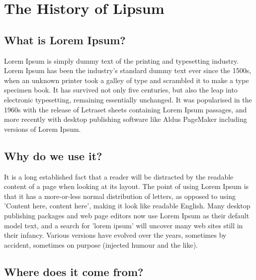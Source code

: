 





\tableofcontents


\chapter{The History of Lipsum}

\section{What is Lorem Ipsum?}

Lorem Ipsum is simply dummy text of the printing and typesetting industry. Lorem Ipsum has been the industry's standard dummy text ever since the 1500s, when an unknown printer took a galley of type and scrambled it to make a type specimen book. It has survived not only five centuries, but also the leap into electronic typesetting, remaining essentially unchanged. It was popularised in the 1960s with the release of Letraset sheets containing Lorem Ipsum passages, and more recently with desktop publishing software like Aldus PageMaker including versions of Lorem Ipsum.

\section{Why do we use it?}

It is a long established fact that a reader will be distracted by the readable content of a page when looking at its layout. The point of using Lorem Ipsum is that it has a more-or-less normal distribution of letters, as opposed to using 'Content here, content here', making it look like readable English. Many desktop publishing packages and web page editors now use Lorem Ipsum as their default model text, and a search for 'lorem ipsum' will uncover many web sites still in their infancy. Various versions have evolved over the years, sometimes by accident, sometimes on purpose (injected humour and the like).

\section{Where does it come from?}

